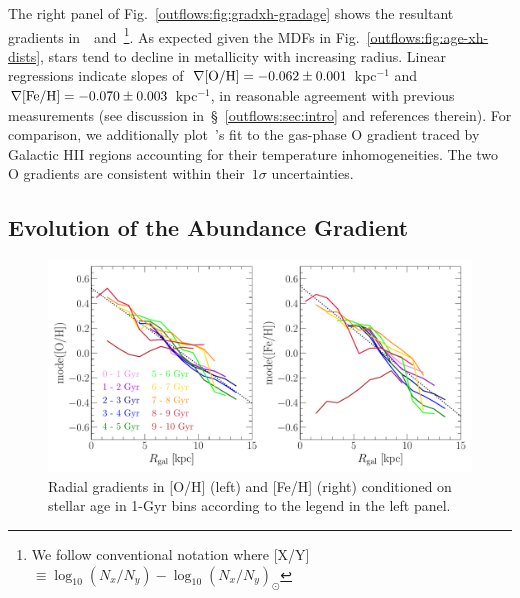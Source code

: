 The right panel of Fig.~\ref{outflows:fig:gradxh-gradage} shows the resultant
gradients in~\oh~and~\feh\footnote{
	We follow conventional notation where
	[X/Y]~$\equiv \log_{10} (N_x / N_y) - \log_{10} (N_x / N_y)_\odot$
}.
As expected given the MDFs in Fig.~\ref{outflows:fig:age-xh-dists}, stars tend
to decline in metallicity with increasing radius.
Linear regressions indicate slopes of~$\nabla\text{[O/H]} = -0.062 \pm 0.001$ kpc$^{-1}$
and~$\nabla\text{[Fe/H]} = -0.070 \pm 0.003$ kpc$^{-1}$, in reasonable agreement with
previous measurements (see discussion in~\S~\ref{outflows:sec:intro} and
references therein).
For comparison, we additionally plot~\citeauthor{MendezDelgado2022}'s
\citeyearpar{MendezDelgado2022} fit to the gas-phase O gradient traced by
Galactic HII regions accounting for their temperature inhomogeneities.
The two O gradients are consistent within their~$1\sigma$ uncertainties.

\subsection{Evolution of the Abundance Gradient}
\label{outflows:sec:empirical:evolution}

\begin{figure}
\centering
\includegraphics[scale = 0.55]{gradxh_fixedage.pdf}
\caption{
Radial gradients in [O/H] (left) and [Fe/H] (right) conditioned on stellar age
in 1-Gyr bins according to the legend in the left panel.
}
\label{outflows:fig:gradxh-fixed-age}
\end{figure}

